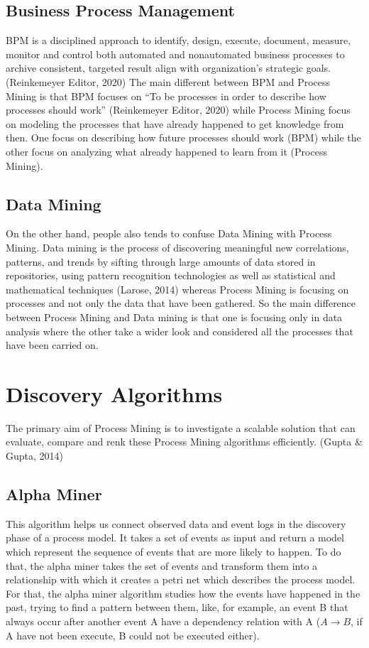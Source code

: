 \documentclass[conference]{IEEEtran}
\begin{document}
\subsection{Business Process Management}

BPM is a disciplined approach to identify, design, execute, document, measure, monitor and control both automated and nonautomated business processes to archive consistent, targeted result align with organization’s strategic goals. (Reinkemeyer Editor, 2020) 
The main different between BPM and Process Mining is that BPM focuses on “To be processes in order to describe how processes should work”  (Reinkemeyer Editor, 2020) while Process Mining focus on modeling the processes that have already happened to get knowledge from then. One focus on describing how future processes should work (BPM) while the other focus on analyzing what already happened to learn from it (Process Mining).

\subsection{Data Mining}
On the other hand, people also tends to confuse Data Mining with Process Mining. Data mining is the process of discovering meaningful new correlations, patterns, and trends by sifting through large amounts of data stored in repositories, using pattern recognition technologies as well as statistical and mathematical techniques (Larose, 2014) whereas Process Mining is focusing on processes and not only the data that have been gathered. So the main difference between Process Mining and Data mining is that one is focusing only in data analysis where the other take a wider look and considered all the processes that have been carried on.

\section{Discovery Algorithms}

The primary aim of Process Mining is to investigate a scalable solution that can evaluate, compare and renk these Process Mining algorithms efficiently. (Gupta \& Gupta, 2014)

\subsection{Alpha Miner}

This algorithm helps us connect observed data and event logs in the discovery phase of a process model. It takes a set of events as input and return a model which represent the sequence of events that are more likely to happen.
To do that, the alpha miner takes the set of events and transform them into a relationship with which it creates a petri net which describes the process model. For that, the alpha miner algorithm studies how the events have happened in the past, trying to find a pattern between them, like, for example, an event B that always occur after another event A have a dependency relation with A ($A\rightarrow B$, if A have not been execute, B could not be executed either).
\end{document}
